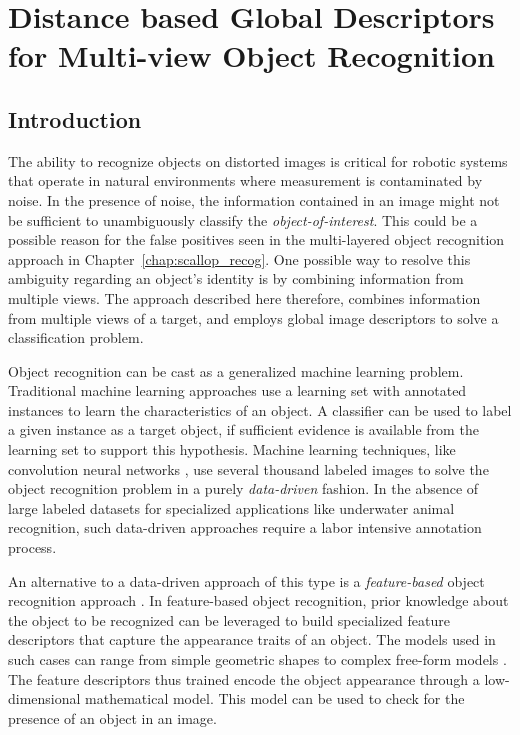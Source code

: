 
\chapter{Distance based Global Descriptors for Multi-view Object Recognition}
\label{chap:distdes}

\section{Introduction}

The ability to recognize objects on distorted images is critical for robotic systems that operate in natural environments where measurement is contaminated by noise. In the presence of noise, the information contained in an image might not be sufficient to unambiguously classify the \emph{object-of-interest}. This could be a possible reason for the false positives seen in the multi-layered object recognition approach in Chapter~\ref{chap:scallop_recog}.
One possible way to resolve this ambiguity regarding an object's identity is by combining information from multiple views. The approach described here therefore, combines information from multiple views of a target, and employs global image descriptors to solve a classification problem.

Object recognition can be cast as a generalized machine learning problem.
Traditional machine learning approaches \cite{alpaydin} use a learning set with annotated instances to learn the characteristics of an object. A classifier can be used to label a given instance as a target object, if sufficient evidence is available from the learning set to support this hypothesis. Machine learning techniques, like convolution neural networks \cite{cnn}, use several thousand labeled images to solve the object recognition problem in a purely \emph{data-driven} fashion. In the absence of large labeled datasets for specialized applications like underwater animal recognition, such data-driven approaches require a labor intensive annotation process.

An alternative to a data-driven approach of this type is a \emph{feature-based} object recognition approach \cite{roth}. In feature-based object recognition, prior knowledge about the object to be recognized can be leveraged to build specialized feature descriptors that capture the appearance traits of an object. The models used in such cases can range from simple geometric shapes to complex free-form models \cite{campbell, belongie}. The feature descriptors thus trained encode the object appearance through a low-dimensional mathematical model. This model can be used to check for the presence of an object in an image.

